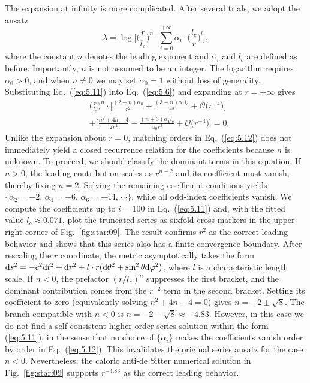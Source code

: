 \documentclass[aps,prd,twocolumn]{revtex4-2}
\newcommand\dx{{\rm d}}
\begin{document}
The expansion at infinity is more complicated. After several trials, we adopt the ansatz
\begin{equation}\label{eq:5.11}
  \lambda = \log \bigg[ \Big(\frac{r}{l_c}\Big)^{n}\cdot\sum_{i=0}^{+\infty} \alpha_i\cdot\Big(\frac{l_c}{r}\Big)^{i} \bigg],
\end{equation}
where the constant $n$ denotes the leading exponent and $\alpha_i$ and $l_c$ are defined as before. Importantly, $n$ is not assumed to be an integer. The logarithm requires $\alpha_0>0$, and when $n\neq0$ we may set $\alpha_0=1$ without loss of generality. Substituting Eq.~(\ref{eq:5.11}) into Eq.~(\ref{eq:5.6}) and expanding at $r=+\infty$ gives
\begin{align}\label{eq:5.12}
  & \Big(\frac{r}{l_c}\Big)^n \cdot \bigg[ \frac{(2-n)\alpha_0}{r^2} + \frac{(3-n)\alpha_1 l_c}{r^3} + \mathcal{O}\big(r^{-4}\big) \bigg] \nonumber\\
  & + \bigg[ \frac{n^2+4n-4}{2r^2} - \frac{(n+3)\alpha_1 l_c}{\alpha_0 r^3} + \mathcal{O}\big(r^{-4}\big) \bigg] = 0. 
\end{align}
Unlike the expansion about $r=0$, matching orders in Eq.~(\ref{eq:5.12}) does not immediately yield a closed recurrence relation for the coefficients because $n$ is unknown. To proceed, we should classify the dominant terms in this equation. If $n>0$, the leading contribution scales as $r^{n-2}$ and its coefficient must vanish, thereby fixing $n=2$. Solving the remaining coefficient conditions yields $\{\alpha_2=-2,\,\alpha_4=-6,\,\alpha_6=-44,\,\cdots\}$, while all odd-index coefficients vanish. We compute the coefficients up to $i=100$ in Eq.~(\ref{eq:5.11}) and, with the fitted value $l_c\approx0.071$, plot the truncated series as sixfold-cross markers in the upper-right corner of Fig.~\ref{fig:star:09}. The result confirms $r^2$ as the correct leading behavior and shows that this series also has a finite convergence boundary. After rescaling the $r$ coordinate, the metric asymptotically takes the form $\dx s^2=-c^2\dx t^2 + \dx r^2 + l\cdot r(\dx\theta^2+\sin^2\theta\dx\varphi^2)$, where $l$ is a characteristic length scale. If $n<0$, the prefactor $(r/l_c)^n$ suppresses the first bracket, and the dominant contribution comes from the $r^{-2}$ term in the second bracket. Setting its coefficient to zero (equivalently solving $n^2+4n-4=0$) gives $n=-2\pm\sqrt{8}$. The branch compatible with $n<0$ is $n=-2-\sqrt{8}\approx-4.83$. However, in this case we do not find a self-consistent higher-order series solution within the form (\ref{eq:5.11}), in the sense that no choice of $\{\alpha_i\}$ makes the coefficients vanish order by order in Eq.~(\ref{eq:5.12}). This invalidates the original series ansatz for the case $n<0$. Nevertheless, the caloric anti-de Sitter numerical solution in Fig.~\ref{fig:star:09} supports $r^{-4.83}$ as the correct leading behavior.
\end{document}
